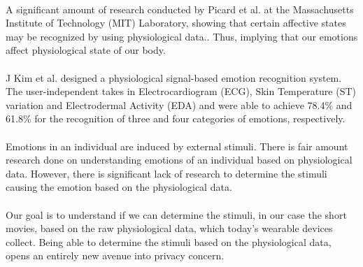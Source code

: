 \paragraph{}
A significant amount of research conducted by Picard et al. at the Massachusetts Institute of Technology (MIT) Laboratory, showing that certain affective states may be recognized by using physiological data.\cite{picard_toward_2001}. Thus, implying that our emotions affect physiological state of our body.
\paragraph{}
J Kim et al. designed a physiological signal-based emotion recognition system. The user-independent takes in Electrocardiogram (ECG), Skin Temperature (ST) variation and Electrodermal Activity (EDA) and were able to achieve 78.4\% and 61.8\% for the recognition of three and four categories of emotions, respectively.\cite{kim_emotion_2004}
\paragraph{} 
Emotions in an individual are induced by external stimuli. There is fair amount research done on understanding emotions of an individual based on physiological data. However, there is significant lack of research to determine the stimuli causing the emotion based on the physiological data.
\paragraph{}
Our goal is to understand if we can determine the stimuli, in our case the short movies, based on the raw physiological data, which today’s wearable devices collect. Being able to determine the stimuli based on the physiological data, opens an entirely new avenue into privacy concern.